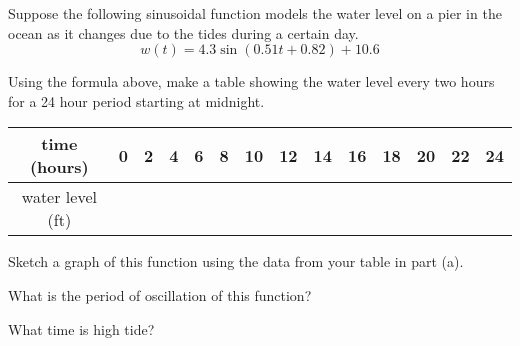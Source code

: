 \begin{activity}\label{A:0.5.2}
Suppose the following sinusoidal function models the water level on a pier in the ocean as
it changes due to the tides during a certain day.
\[ w(t) = 4.3 \sin \left( 0.51 t + 0.82 \right) + 10.6 \]
\ba
\item Using the formula above, make a table showing the water level every two hours for a 24 hour period starting at midnight.
    \begin{center}
        \begin{tabular}[h!]{|c||c|c|c|c|c|c|c|c|c|c|c|c|c|}
            \hline
            time (hours) & 0 & 2 & 4 & 6 & 8 & 10 & 12 & 14 & 16 & 18 & 20 & 22 & 24 \\
            \hline
            water level (ft) & & & & & & & & & & & & & \\ \hline
        \end{tabular}
    \end{center}
\item Sketch a graph of this function using the data from your table in part (a).
    \begin{center}
    \end{center}
\item What is the period of oscillation of this function? %
\item What time is high tide?  %

\ea
\end{activity}\aftera
